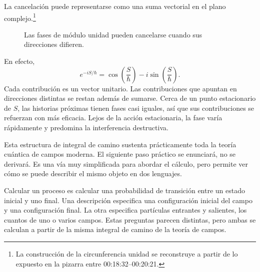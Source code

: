 
La cancelación puede representarse como una suma vectorial en el plano complejo.\footnote{La construcción de la circunferencia unidad se reconstruye a partir de lo expuesto en la pizarra entre 00:18:32--00:20:21.}
\begin{figure}[htbp]
\centering
{}
\caption{Las fases de módulo unidad pueden cancelarse cuando sus direcciones difieren.}
\end{figure}

En efecto,
\begin{equation}
e^{-iS/\hbar}
=
\cos\!\left(\frac{S}{\hbar}\right)
-i\sin\!\left(\frac{S}{\hbar}\right).
\end{equation}
Cada contribución es un vector unitario. Las contribuciones que apuntan en direcciones distintas se restan además de sumarse. Cerca de un punto estacionario de \(S\), las historias próximas tienen fases casi iguales, así que sus contribuciones se refuerzan con más eficacia. Lejos de la acción estacionaria, la fase varía rápidamente y predomina la interferencia destructiva.

Esta estructura de integral de camino sustenta prácticamente toda la teoría cuántica de campos moderna. El siguiente paso práctico se enunciará, no se derivará. Es una vía muy simplificada para abordar el cálculo, pero permite ver cómo se puede describir el mismo objeto en dos lenguajes.

Calcular un proceso es calcular una probabilidad de transición entre un estado inicial y uno final. Una descripción especifica una configuración inicial del campo y una configuración final. La otra especifica partículas entrantes y salientes, los cuantos de uno o varios campos. Estas preguntas parecen distintas, pero ambas se calculan a partir de la misma integral de camino de la teoría de campos.

